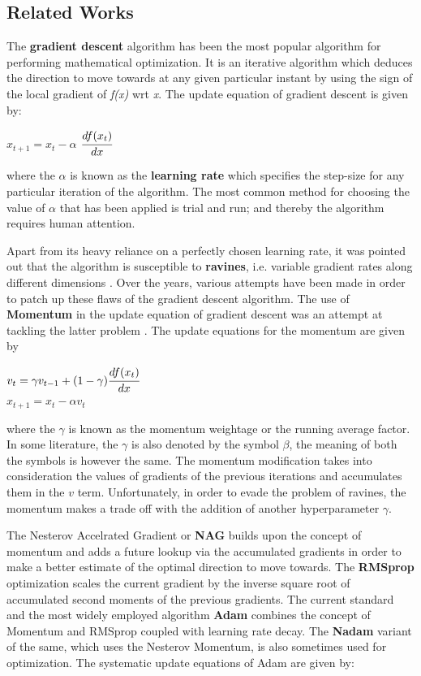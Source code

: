 \documentclass{article}
\begin{document}
\subsection{Related Works}
The \textbf{gradient descent} algorithm \cite{cauchy:gradient-descent} has been the most popular algorithm for performing mathematical optimization. It is an iterative algorithm which deduces the direction to move towards at any given particular instant by using the sign of the local gradient of \textit{f(x)} wrt \textit{x}. The update equation of gradient descent is given by:

\begin{center}
	$x_{t + 1} = x_{t} - \alpha $ $\cfrac{df(x_t)}{dx}$
\end{center}

where the $\alpha$ is known as the \textbf{learning rate} which specifies the step-size for any particular iteration of the algorithm. The most common method for choosing the value of $\alpha$ that has been applied is trial and run; and thereby the algorithm requires human attention.


Apart from its heavy reliance on a perfectly chosen learning rate, it was pointed out that the algorithm is susceptible to \textbf{ravines}, i.e. variable gradient rates along different dimensions \cite{sutton:gradient-descent-problems}. Over the years, various attempts have been made in order to patch up these flaws of the gradient descent algorithm. The use of \textbf{Momentum} in the update equation of gradient descent was an attempt at tackling the latter problem \cite{qian:momentum}. The update equations for the momentum are given by

\begin{center}
	$v_t = \gamma v_{t - 1} + (1 - \gamma) \cfrac{df(x_t)}{dx} $\\
	$x_{t + 1} = x_{t} - \alpha v_t$
\end{center}

where the $\gamma$ is known as the momentum weightage or the running average factor. In some literature, the $\gamma$ is also denoted by the symbol $\beta$, the meaning of both the symbols is however the same. The momentum modification takes into consideration the values of gradients of the previous iterations and accumulates them in the $v$ term. Unfortunately, in order to evade the problem of ravines, the momentum makes a trade off with the addition of another hyperparameter $\gamma$.


The Nesterov Accelrated Gradient or \textbf{NAG} \cite{nesterov:momentum} builds upon the concept of momentum and adds a future lookup via the accumulated gradients in order to make a better estimate of the optimal direction to move towards. The \textbf{RMSprop} optimization scales the current gradient by the inverse square root of accumulated second moments of the previous gradients. The current standard and the most widely employed algorithm \textbf{Adam} \cite{kingma-ba:adam} combines the concept of Momentum and RMSprop coupled with learning rate decay. The \textbf{Nadam} variant of the same, which uses the Nesterov Momentum, is also sometimes used for optimization. The systematic update equations of Adam are given by:
\end{document}
